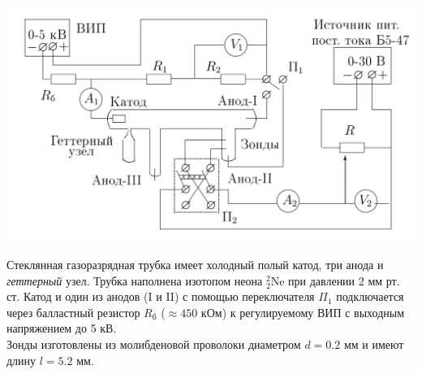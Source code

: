 \documentclass[a4paper,12pt]{article}
\begin{document}
\paragraph{}
\begin{center}
\includegraphics[scale=0.55]{setup.png}
\end{center}
\setlength{\parindent}{1.5 cm}
	Стеклянная газоразрядная трубка имеет холодный полый катод, три анода и \textit{геттерный} узел. Трубка наполнена изотопом неона $^2_2$Ne при давлении 2 мм рт. ст. Катод и один из анодов (I и II) с помощью переключателя $\Pi_1$ подключается через балластный резистор $R_\text{б}$ ($\approx 450$ кОм) к регулируемому ВИП с выходным напряжением до 5 кВ.\\
	Зонды изготовлены из молибденовой проволоки диаметром $d = 0.2$ мм и имеют длину $l = 5.2$ мм.
\end{document}
